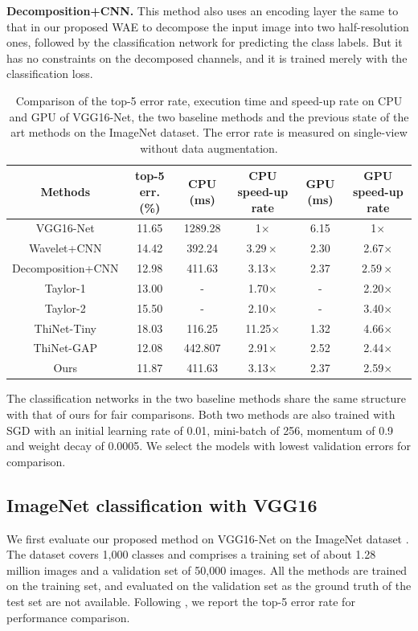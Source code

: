 \documentclass[letterpaper]{article} %
\begin{document}
\noindent\textbf{Decomposition+CNN. }This method also uses an encoding layer the same to that in our proposed WAE to decompose the input image into two half-resolution ones, followed by the classification network for predicting the class labels. But it has no constraints on the decomposed channels, and it is trained merely with the classification loss.

\begin{table}[!t]
\centering
\begin{tabular}{c|c|c|c|c|c}
\hline
\centering  Methods  & top-5 err. (\%)& CPU (ms)  & CPU speed-up rate  & GPU (ms) & GPU speed-up rate\\
\hline
\hline
VGG16-Net   & 11.65  & 1289.28& 1$\times$ & 6.15&1$\times$  \\
\hline
Wavelet+CNN      &  14.42 & 392.24  & $3.29\times$  & 2.30  & 2.67$\times$  \\
Decomposition+CNN      &  12.98 & 411.63 & 3.13$\times$ & 2.37  & $2.59\times$\\
\hline
Taylor-1 & 13.00  & - & 1.70$\times$ & - & 2.20$\times$ \\
Taylor-2 & 15.50  & - & 2.10$\times$ & - & 3.40$\times$ \\
ThiNet-Tiny & 18.03  & 116.25  & 11.25$\times$ & 1.32 & 4.66$\times$ \\
ThiNet-GAP & 12.08  &442.807  & 2.91$\times$ &2.52 & 2.44$\times$\\
\hline
Ours   & 11.87  & 411.63 & 3.13$\times$ & 2.37  & 2.59$\times$ \\
\hline
\end{tabular}
\caption{Comparison of the top-5 error rate, execution time and speed-up rate on CPU and GPU of VGG16-Net, the two baseline methods and the previous state of the art methods on the ImageNet dataset. The error rate is measured on single-view without data augmentation.}
\label{table:imagenet_comparison}
\end{table}

The classification networks in the two baseline methods share the same structure with that of ours for fair comparisons. Both two methods are also trained with SGD with an initial learning rate of 0.01, mini-batch of 256, momentum of 0.9 and weight decay of 0.0005. We select the models with lowest validation errors for comparison.

\subsection{ImageNet classification with VGG16}
We first evaluate our proposed method on VGG16-Net on the ImageNet dataset \cite{russakovsky2015imagenet}. The dataset covers 1,000 classes and comprises a training set of about 1.28 million images and a validation set of 50,000 images. All the methods are trained on the training set, and evaluated on the validation set as the ground truth of the test set are not available. Following \cite{zhang2016accelerating}, we report the top-5 error rate for performance comparison.
\end{document}
